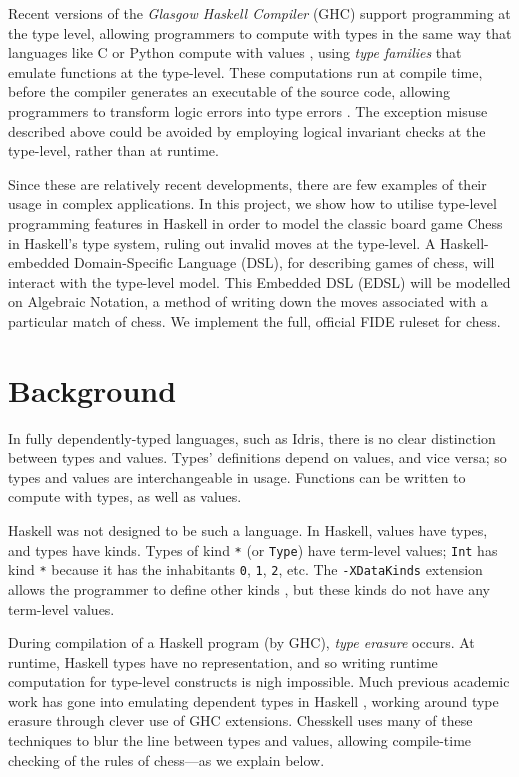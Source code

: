 \documentclass[12pt, a4paper, bibliography=totocnumbered]{scrartcl}
\begin{document}
Recent versions of the \emph{Glasgow Haskell Compiler} (GHC) support programming at the type level, allowing programmers to compute with types in the same way that languages like C or Python compute with values \cite{yorgey2012giving}, using \emph{type families} \cite{opentfs} \cite{closedtfs} that emulate functions at the type-level. These computations run at compile time, before the compiler generates an executable of the source code, allowing programmers to transform logic errors into type errors \cite{twt}. The exception misuse described above could be avoided by employing logical invariant checks at the type-level, rather than at runtime.

Since these are relatively recent developments, there are few examples of their usage in complex applications. In this project, we show how to utilise type-level programming features in Haskell in order to model the classic board game Chess in Haskell's type system, ruling out invalid moves at the type-level. A Haskell-embedded Domain-Specific Language (DSL), for describing games of chess, will interact with the type-level model. This Embedded DSL (EDSL) will be modelled on Algebraic Notation, a method of writing down the moves associated with a particular match of chess. We implement the full, official FIDE ruleset for chess.

\section{Background}

In fully dependently-typed languages, such as Idris, there is no clear distinction between types and values. Types' definitions depend on values, and vice versa; so types and values are interchangeable in usage. Functions can be written to compute with types, as well as values.

Haskell was not designed to be such a language. In Haskell, values have types, and types have kinds. Types of kind \lstinline{*} (or \lstinline{Type}) have term-level values; \lstinline{Int} has kind \lstinline{*} because it has the inhabitants \lstinline{0}, \lstinline{1}, \lstinline{2}, etc. The \lstinline{-XDataKinds} extension allows the programmer to define other kinds \cite{yorgey2012giving}, but these kinds do not have any term-level values.

During compilation of a Haskell program (by GHC), \emph{type erasure} occurs. At runtime, Haskell types have no representation, and so writing runtime computation for type-level constructs is nigh impossible. Much previous academic work has gone into emulating dependent types in Haskell \cite{singletons}, working around type erasure through clever use of GHC extensions. Chesskell uses many of these techniques to blur the line between types and values, allowing compile-time checking of the rules of chess---as we explain below.
\end{document}
